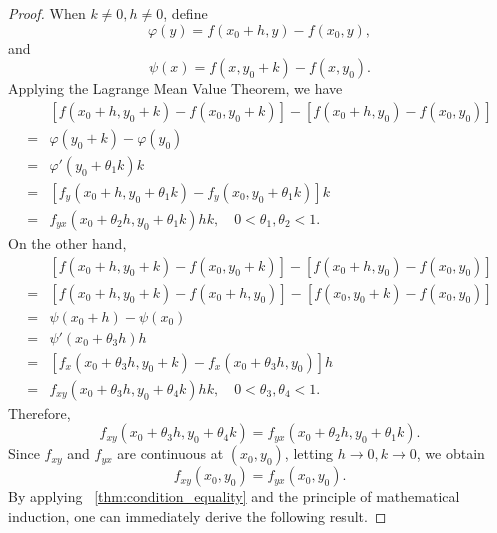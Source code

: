 \documentclass[11pt]{../../TexTemplate/elegantbook}
\begin{document}
\begin{proof}
    When $k \neq 0, h \neq 0$, define
    \[
        \varphi(y) = f(x_0 + h, y) - f(x_0, y),
    \]
    and
    \[
        \psi(x) = f(x, y_0 + k) - f(x, y_0).
    \]
    Applying the Lagrange Mean Value Theorem, we have
    \[
        \begin{aligned}
            &[f(x_0 + h, y_0 + k) - f(x_0, y_0 + k)] - [f(x_0 + h, y_0) - f(x_0, y_0)] \\
            =& \varphi(y_0 + k) - \varphi(y_0) \\
            =& \varphi'(y_0 + \theta_1 k) k \\
            =& [f_y(x_0 + h, y_0 + \theta_1 k) - f_y(x_0, y_0 + \theta_1 k)] k \\
            =& f_{yx}(x_0 + \theta_2 h, y_0 + \theta_1 k) h k, \quad 0 < \theta_1, \theta_2 < 1.
        \end{aligned}
    \]
    On the other hand,
    \[
        \begin{aligned}
            &[f(x_0 + h, y_0 + k) - f(x_0, y_0 + k)] - [f(x_0 + h, y_0) - f(x_0, y_0)] \\
            =& [f(x_0 + h, y_0 + k) - f(x_0 + h, y_0)] - [f(x_0, y_0 + k) - f(x_0, y_0)] \\
            =& \psi(x_0 + h) - \psi(x_0) \\
            =& \psi'(x_0 + \theta_3 h) h \\
            =& [f_x(x_0 + \theta_{3}h, y_0 + k) - f_x(x_0 + \theta_{3}h, y_0)] h \\
            =& f_{xy}(x_0 + \theta_3 h, y_0 + \theta_4 k) h k, \quad 0 < \theta_3, \theta_4 < 1.
        \end{aligned}
    \]
    Therefore,
    \[
    f_{xy}(x_0 + \theta_3 h, y_0 + \theta_4 k) = f_{yx}(x_0 + \theta_2 h, y_0 + \theta_1 k).
    \]
    Since $f_{xy}$ and $f_{yx}$ are continuous at $(x_0, y_0)$, letting $h \to 0, k \to 0$, we obtain
    \[
    f_{xy}(x_0, y_0) = f_{yx}(x_0, y_0).
    \]
    By applying ~\ref{thm:condition_equality} and the principle of mathematical induction, one can immediately derive the following result.
\end{proof}
\end{document}

